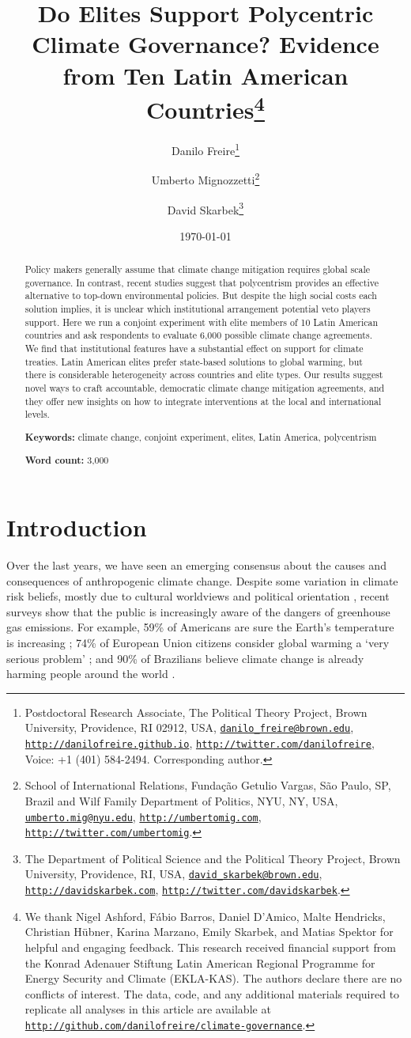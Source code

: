 \documentclass[a4paper,12pt]{article}
\title{Do Elites Support Polycentric Climate Governance? Evidence from Ten Latin American Countries\thanks{We thank Nigel Ashford, F\'{a}bio Barros, Daniel D'Amico, Malte Hendricks, Christian H\"{u}bner, Karina Marzano, Emily Skarbek, and Matias Spektor for helpful and engaging feedback. This research received financial support from the Konrad Adenauer Stiftung Latin American Regional Programme for Energy Security and Climate (EKLA-KAS). The authors declare there are no conflicts of interest. The data, code, and any additional materials required to replicate all analyses in this article are available at \href{http://github.com/danilofreire/climate-governance}{\texttt{http://github.com/danilofreire/climate-governance}}.}}
\author{Danilo Freire\thanks{Postdoctoral Research Associate, The Political Theory Project, Brown University, Providence, RI 02912, USA, \href{mailto:danilo_freire@brown.edu}{\texttt{danilo\_freire@brown.edu}}, \href{http://danilofreire.github.io}{\texttt{http://danilofreire.github.io}}, \href{http://twitter.com/danilofreire}{\texttt{http://twitter.com/danilofreire}}, Voice: +1 (401) 584-2494. Corresponding author.} 
\and Umberto Mignozzetti\thanks{School of International Relations, Funda\c{c}\~{a}o Getulio Vargas, S\~{a}o Paulo, SP, Brazil and Wilf Family Department of Politics, NYU, NY, USA, \href{mailto:umberto.mig@nyu.edu}{\texttt{umberto.mig@nyu.edu}}, \href{http://umbertomig.com}{\texttt{http://umbertomig.com}}, \href{http://twitter.com/umbertomig}{\texttt{http://twitter.com/umbertomig}}.} \and David Skarbek\thanks{The Department of Political Science and the Political Theory Project, Brown University, Providence, RI, USA, \href{mailto:david_skarbek@brown.edu}{\texttt{david\_skarbek@brown.edu}}, \href{http://davidskarbek.com}{\texttt{http://davidskarbek.com}}, \href{http://twitter.com/davidskarbek}{\texttt{http://twitter.com/davidskarbek}}.}
}
\date{\today}
\begin{document}
\maketitle

\begin{abstract}
\onehalfspacing
\noindent
Policy makers generally assume that climate change mitigation requires global scale governance. In contrast, recent studies suggest that polycentrism provides an effective alternative to top-down environmental policies. But despite the high social costs each solution implies, it is unclear which institutional arrangement potential veto players support. Here we run a conjoint experiment with elite members of 10 Latin American countries and ask respondents to evaluate 6,000 possible climate change agreements. We find that institutional features have a substantial effect on support for climate treaties. Latin American elites prefer state-based solutions to global warming, but there is considerable heterogeneity across countries and elite types. Our results suggest novel ways to craft accountable, democratic climate change mitigation agreements, and they offer new insights on how to integrate interventions at the local and international levels.

\vspace{.5cm}

\noindent 
\textbf{Keywords:} climate change, conjoint experiment, elites, Latin America, polycentrism

\vspace{.5cm}

\noindent 
\textbf{Word count:} 3,000
\end{abstract}

\newpage

\doublespacing

\section{Introduction}%
\label{sec:introduction}

Over the last years, we have seen an emerging consensus about the causes and consequences of anthropogenic climate change. Despite some variation in climate risk beliefs, mostly due to cultural worldviews and political orientation \citep{hornsey2016meta}, recent surveys show that the public is increasingly aware of the dangers of greenhouse gas emissions. For example, 59\% of Americans are sure the Earth's temperature is increasing \citep{stanfordearth2018}; 74\% of European Union citizens consider global warming a `very serious problem' \citep{europe2018survey}; and 90\% of Brazilians believe climate change is already harming people around the world \citep{pew2018climate}.
\end{document}
